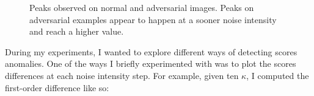 \begin{figure}[!t]


    \caption{Peaks observed on normal and adversarial images. Peaks on
        adversarial examples appear to happen at a sooner noise intensity and
        reach a higher value.}
    \label{fig:peaks}
\end{figure}
During my experiments, I wanted to explore different ways of detecting scores
anomalies. One of the ways I briefly experimented with was to plot the scores
differences at each noise intensity step. For example, given ten $\kappa$, I
computed the first-order difference like so:

